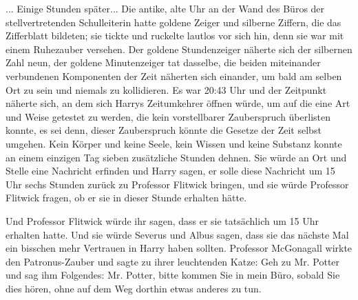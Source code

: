 ... Einige Stunden später... Die antike, alte Uhr an der Wand des Büros der
stellvertretenden Schulleiterin hatte goldene Zeiger und silberne Ziffern, die
das Zifferblatt bildeten; sie tickte und ruckelte lautlos vor sich hin, denn sie
war mit einem Ruhezauber versehen. Der goldene Stundenzeiger näherte sich der
silbernen Zahl neun, der goldene Minutenzeiger tat dasselbe, die beiden
miteinander verbundenen Komponenten der Zeit näherten sich einander, um bald am
selben Ort zu sein und niemals zu kollidieren. Es war 20:43 Uhr und der
Zeitpunkt näherte sich, an dem sich Harrys Zeitumkehrer öffnen würde, um auf die
eine Art und Weise getestet zu werden, die kein vorstellbarer Zauberspruch
überlisten konnte, es sei denn, dieser Zauberspruch könnte die Gesetze der Zeit
selbst umgehen. Kein Körper und keine Seele, kein Wissen und keine Substanz
konnte an einem einzigen Tag sieben zusätzliche Stunden dehnen. Sie würde an Ort
und Stelle eine Nachricht erfinden und Harry sagen, er solle diese Nachricht um
15 Uhr sechs Stunden zurück zu Professor Flitwick bringen, und sie würde
Professor Flitwick fragen, ob er sie in dieser Stunde erhalten hätte.

Und Professor Flitwick würde ihr sagen, dass er sie tatsächlich um 15 Uhr
erhalten hatte. Und sie würde Severus und Albus sagen, dass sie das nächste Mal
ein bisschen mehr Vertrauen in Harry haben sollten. Professor McGonagall wirkte
den Patronus-Zauber und sagte zu ihrer leuchtenden Katze: \glqq Geh zu Mr.
Potter und sag ihm Folgendes: Mr. Potter, bitte kommen Sie in mein Büro, sobald
Sie dies hören, ohne auf dem Weg dorthin etwas anderes zu tun.

